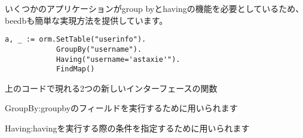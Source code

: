 いくつかのアプリケーションがgroup byとhavingの機能を必要としているため、beedbも簡単な実現方法を提供しています。


\begin{lstlisting}[numbers=none]
a, _ := orm.SetTable("userinfo").
            GroupBy("username").
            Having("username='astaxie'").
            FindMap()
\end{lstlisting}

上のコードで現れる2つの新しいインターフェースの関数

GroupBy:groupbyのフィールドを実行するために用いられます

Having:havingを実行する際の条件を指定するために用いられます


